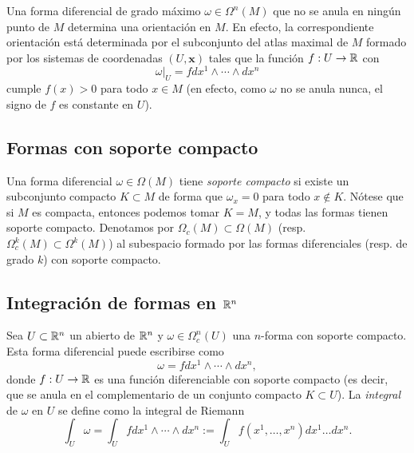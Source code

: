 \documentclass[11pt,a4paper]{amsbook}
\theoremstyle{remark} \newtheorem{rmk}[subsection]{Observación}
\theoremstyle{definition} \newtheorem{defn}[subsection]{Definición}
\theoremstyle{definition} \newtheorem{ex}[subsection]{Ejemplo}
\theoremstyle{definition} \newtheorem{ej}[subsection]{Ejercicio}
\begin{document}
Una forma diferencial de grado máximo $\omega \in \Omega^n(M)$ que no se anula en ningún punto de $M$ determina una orientación en $M$. En efecto, la correspondiente orientación está determinada por el subconjunto del atlas maximal de $M$ formado por los sistemas de coordenadas $(U,\bm{x})$ tales que la función $f:U\rightarrow \mathbb R$ con
\begin{equation*}
\omega|_U = f dx^1\wedge \cdots \wedge dx^n
\end{equation*}
cumple $f(x)>0$ para todo $x\in M$ (en efecto, como $\omega$ no se anula nunca, el signo de $f$ es constante en $U$).

\subsection{Formas con soporte compacto} Una forma diferencial $\omega \in \Omega(M)$ tiene \emph{soporte compacto} si existe un subconjunto compacto $K\subset M$ de forma que $\omega_x = 0$ para todo $x\not \in K$. Nótese que si $M$ es compacta, entonces podemos tomar $K=M$, y todas las formas tienen soporte compacto. Denotamos por $\Omega_c(M)\subset \Omega(M)$ (resp. $\Omega_c^k(M)\subset \Omega^k(M)$) al subespacio formado por las formas diferenciales (resp. de grado $k$) con soporte compacto.

\subsection{Integración de formas en $\mathbb R^n$} Sea $U\subset \mathbb R^n$ un abierto de $\mathbb R^n$ y $\omega \in \Omega^n_c(U)$ una $n$-forma con soporte compacto. Esta forma diferencial puede escribirse como
\begin{equation*}
\omega = f dx^1\wedge \cdots \wedge dx^n,
\end{equation*}
donde $f:U\rightarrow \mathbb R$ es una función diferenciable con soporte compacto (es decir, que se anula en el complementario de un conjunto compacto $K\subset U$). La \emph{integral} de $\omega$ en $U$ se define como la integral de Riemann
\begin{equation*}
\int_{U} \omega = \int_{U} f dx^1\wedge \cdots \wedge dx^n := \int_{U} f(x^1,\dots,x^n) dx^1\dots dx^n.
\end{equation*}
\end{document}
